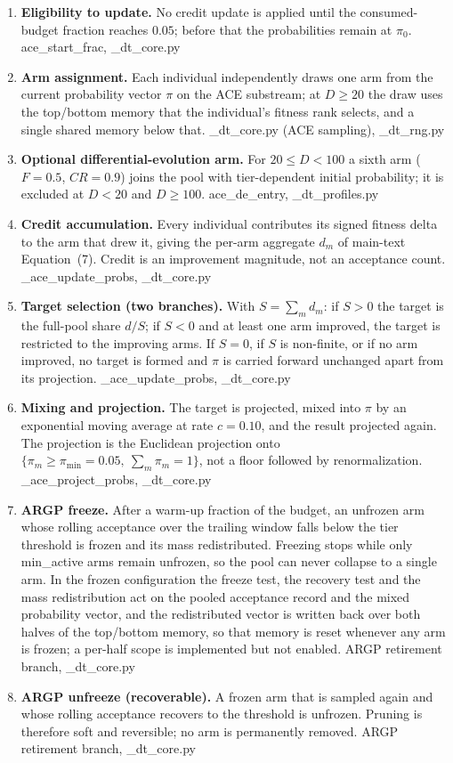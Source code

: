 \documentclass[10pt,a4paper]{article}
\begin{document}
\begin{enumerate}\itemsep2pt
\item \textbf{Eligibility to update.} No credit update is applied until the
  consumed-budget fraction reaches $0.05$; before that the probabilities remain
  at $\pi_0$. \hfill ace\_start\_frac, \_dt\_core.py
\item \textbf{Arm assignment.} Each individual independently draws one arm from
  the current probability vector $\pi$ on the ACE substream; at $D\ge 20$ the
  draw uses the top/bottom memory that the individual's fitness rank selects,
  and a single shared memory below that.
  \hfill\_dt\_core.py (ACE sampling), \_dt\_rng.py
\item \textbf{Optional differential-evolution arm.} For $20\le D<100$ a sixth
  arm ($F=0.5$, $CR=0.9$) joins the pool with tier-dependent initial
  probability; it is excluded at $D<20$ and $D\ge 100$.
  \hfill ace\_de\_entry, \_dt\_profiles.py
\item \textbf{Credit accumulation.} Every individual contributes its signed
  fitness delta to the arm that drew it, giving the per-arm aggregate $d_m$ of
  main-text Equation~(7). Credit is an improvement magnitude, not an acceptance
  count. \hfill\_ace\_update\_probs, \_dt\_core.py
\item \textbf{Target selection (two branches).} With $S=\sum_m d_m$: if $S>0$
  the target is the full-pool share $d/S$; if $S<0$ and at least one arm
  improved, the target is restricted to the improving arms. If $S=0$, if $S$ is
  non-finite, or if no arm improved, no target is formed and $\pi$ is carried
  forward unchanged apart from its projection.
  \hfill\_ace\_update\_probs, \_dt\_core.py
\item \textbf{Mixing and projection.} The target is projected, mixed into $\pi$
  by an exponential moving average at rate $c=0.10$, and the result projected
  again. The projection is the Euclidean projection onto
  $\{\pi_m\ge\pi_{\min}=0.05,\ \sum_m \pi_m = 1\}$, not a floor followed by
  renormalization. \hfill\_ace\_project\_probs, \_dt\_core.py
\item \textbf{ARGP freeze.} After a warm-up fraction of the budget, an unfrozen
  arm whose rolling acceptance over the trailing window falls below the tier
  threshold is frozen and its mass redistributed. Freezing stops while only
  min\_active arms remain unfrozen, so the pool can never collapse to a
  single arm. In the frozen configuration the freeze test, the recovery test
  and the mass redistribution act on the pooled acceptance record and the
  mixed probability vector, and the redistributed vector is written back over
  both halves of the top/bottom memory, so that memory is reset whenever any
  arm is frozen; a per-half scope is implemented but not enabled.
  \hfill ARGP retirement branch, \_dt\_core.py
\item \textbf{ARGP unfreeze (recoverable).} A frozen arm that is sampled again
  and whose rolling acceptance recovers to the threshold is unfrozen. Pruning is
  therefore soft and reversible; no arm is permanently removed.
  \hfill ARGP retirement branch, \_dt\_core.py
\end{enumerate}
\end{document}
